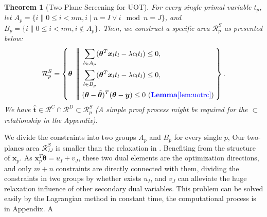 \documentclass[twoside]{article}
\theoremstyle{plain}
\newtheorem{thm}{Theorem}
\renewcommand{\vec}[1]{\bm{#1}}
\newcommand{\changeXS}[1]{\textcolor{blue}{#1}}
\begin{document}
\begin{thm}[Two Plane Screening for UOT]
\label{Thm:AreaScreeningUOT}
For every single primal variable $t_p$, let $A_p = \{ i \| 0\leq i<nm, i\mid n = I \vee i\mod n = J\}$, and $B_p = \{ i \| 0\leq i<nm, i \notin A_p\}$. Then, we construct a specific area $\mathcal{R}^{S}_{p}$ as presented below:
 \begin{equation}
\begin{split} 
\mathcal{R}^S_{p} = \left\{\vec{\theta} \ \left|\!\left| \ 
\begin{aligned}
 &\sum_{l\in A_p}(\vec{\theta}^T\vec{x}_{l}{t_l} - \lambda {c}_l {t_l})\leq 0, \\
 &\sum_{l\in B_p}(\vec{\theta}^T\vec{x}_{l}{t_l} - \lambda {c}_l {t_l})\leq 0, \\
  &(\vec{\theta}-\tilde{\vec{\theta}})^T(\vec{\theta}-\vec{y})\leq 0 \ (\changeXS{\bf Lemma  \ref{lem:uotrc}})
\end{aligned}
\right.\right.
\right\}.
\end{split}
\label{eq:divide}
\end{equation}
We have $\hat{\vec{t}} \in \mathcal{R}^{C}\cap\mathcal{R}^{D} \subset \mathcal{R}^{S}_{p}$ (A simple proof process might be required for the $\subset$ relationship in the Appendix).
\end{thm}

We divide the constraints into two groups $A_p$ and $B_p$ for every single $p$, Our two-planes area $\mathcal{R}^S_{IJ}$ is smaller than the relaxation in \citep{NEURIPS2021_7b5b23f4}. Benefiting from the structure of $\vec x_p$. As $\vec{x}_p^T\vec{\theta} = {u}_{I} + {v}_{J}$, these two dual elements are the optimization directions, and only $m+n$ constraints are directly connected with them, dividing the constraints in two groups by whether exists ${u}_{I}$, and ${v}_{J}$ can alleviate the huge relaxation influence of other secondary dual variables. This problem can be solved easily by the Lagrangian method in constant time, the computational process is in Appendix. A
\end{document}
